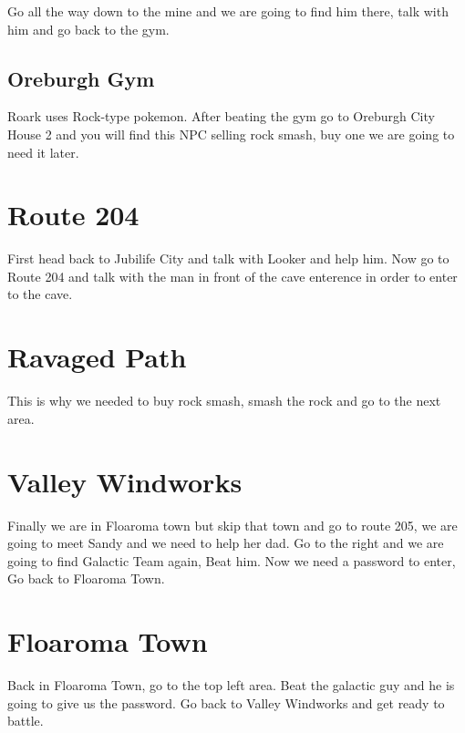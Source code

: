 \documentclass[11pt]{article}
\begin{document}
Go all the way down to the mine and we are going to find him there,
talk with him and go back to the gym.




\subsection{Oreburgh Gym}\label{subsec:oreburgh-gym}
Roark uses Rock-type pokemon.
After beating the gym go to Oreburgh City House 2 and you will find this NPC
selling rock smash, buy one we are going to need it later.

\section{Route 204}\label{sec:Route_204}
First head back to Jubilife City and talk with Looker and help him.
Now go to Route 204 and talk with the man in front of the cave enterence
in order to enter to the cave.





\section{Ravaged Path}\label{sec:Ravaged_Path}
This is why we needed to buy rock smash, smash the rock and go to the next area.





\section{Valley Windworks}\label{sec:valley-windworks}
Finally we are in Floaroma town but skip that town and go to route 205,
we are going to meet Sandy and we need to help her dad.
Go to the right and we are going to find Galactic Team again, Beat him.
Now we need a password to enter, Go back to Floaroma Town.





\section{Floaroma Town}\label{sec:floaroma-town}
Back in Floaroma Town, go to the top left area.
Beat the galactic guy and he is going to give us the password.
Go back to Valley Windworks and get ready to battle.
\end{document}
